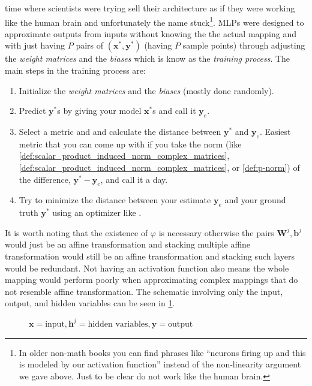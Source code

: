 time where scientists were trying sell their architecture as if they were working like the human brain and unfortunately the name stuck\footnote{
  In older non-math books you can find phrases like ``neurons firing up and this is modeled by our activation function'' 
  instead of the non-linearity argument we gave above. Just to be clear \nns do not work like the human brain.
}.
\ac{MLP}s were designed to approximate outputs from inputs without knowing the the actual mapping 
and with just having $P$ pairs of $\left(\boldsymbol{x}^*,\boldsymbol{y}^*\right)$ (having $P$ sample points) through adjusting the \emph{weight matrices} and the \emph{biases} which is know as the \emph{training process}. 
The main steps in the training process are:
\begin{enumerate}
  \item Initialize the \emph{weight matrices} and the \emph{biases} (mostly done randomly).
  \item Predict $\boldsymbol{y}^*$s by giving your model $\boldsymbol{x}^*$s and call it $\boldsymbol{y}_e$.
  \item Select a metric\cite{Alt2016} and and calculate the distance between $\boldsymbol{y}^*$ and $\boldsymbol{y}_e$. Easiest metric that 
  you can come up with if you take the norm (like \cref{def:scalar_product_induced_norm_complex_matrices}, \cref{def:scalar_product_induced_norm_complex_matrices}, or \cref{def:p-norm}) 
  of the difference, $\boldsymbol{y}^* - \boldsymbol{y}_e$, and call it a day.
  \item Try to minimize the distance between your estimate $\boldsymbol{y}_e$ and your ground truth $\boldsymbol{y}^*$ using an optimizer like \adam\cite{Kingma2014}.
\end{enumerate}  
It is worth noting that the existence of $\varphi$ is necessary otherwise the pairs $\boldsymbol{W}^j,\boldsymbol{b}^j$ would 
just be an affine transformation and stacking multiple affine transformation would still be an affine transformation and stacking 
such layers would be redundant. Not having an activation function also means the whole mapping would perform poorly when approximating 
complex mappings that do not resemble affine transformation. The schematic involving only the input, output, and hidden variables can be seen 
in \cref{fig:multi_layer_perceptron}.
\begin{figure}
  \centering
  \resizebox{0.7\textwidth}{!}{}
  \caption{$\boldsymbol{x} =\text{input},\boldsymbol{h}^j=\text{hidden variables},\boldsymbol{y}=\text{output}$}
  \label{fig:multi_layer_perceptron}
\end{figure}
